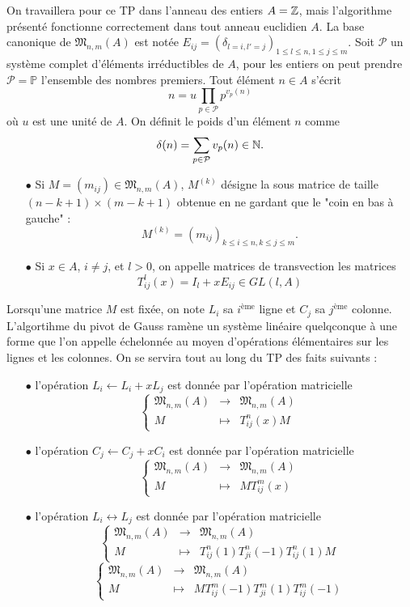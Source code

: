 On travaillera pour ce TP dans l'anneau des entiers $A=\mathbb Z$, mais l'algorithme présenté fonctionne correctement dans tout anneau euclidien $A$. La base canonique de $\mathfrak M_{n,m}(A)$ est notée $E_{ij}=(\delta_{l=i,l'=j})_{1\leq l\leq n,1\leq j\leq m}$. Soit $\mathcal P$ un système complet d'éléments irréductibles de $A$, pour les entiers on peut prendre $\mathcal P=\mathbb P$ l'ensemble des nombres premiers. Tout élément $n\in A$ s'écrit 
\[n=u\prod_{p\in\mathcal P} p^{v_p(n)}\]
où $u$ est une unité de $A$. On définit le poids d'un élément $n$ comme
\[\delta(n)=\sum_{p\in\mathcal P} v_p(n) \in \mathbb N.\]

\begin{itemize}
\item[$\bullet$] Si $M=(m_{ij})\in \mathfrak M_{n,m}(A)$, $M^{(k)}$ désigne la sous matrice de taille $(n-k+1)\times (m-k+1) $ obtenue en ne gardant que le "coin en bas à gauche" :
\[M^{(k)}=(m_{ij})_{k\leq i\leq n,k\leq j\leq m}.\]
\item[$\bullet$] Si $x\in A$, $i\neq j$, et $l>0$, on appelle matrices de transvection les matrices 
\[T_{ij}^l(x)=I_l + xE_{ij}\in GL(l,A)\]
\end{itemize}

Lorsqu'une matrice $M$ est fixée, on note $L_i$ sa $i^{\text{ème}}$ ligne et $C_j$ sa $j^{\text{ème}}$ colonne. L'algortihme du pivot de Gauss ramène un système linéaire quelqconque à une forme que l'on appelle échelonnée au moyen d'opérations élémentaires sur les lignes et les colonnes. On se servira tout au long du TP des faits suivants : \\

\begin{itemize}
\item[$\bullet$] l'opération $L_i\leftarrow L_i+xL_j$ est donnée par l'opération matricielle
\[\left\{\begin{array}{lll} \mathfrak M_{n,m}(A) & \rightarrow & \mathfrak M_{n,m}(A) \\ M & \mapsto& T_{ij}^n(x) M\end{array}\right.\]
\item[$\bullet$] l'opération $C_j\leftarrow C_j+xC_i$ est donnée par l'opération matricielle
\[\left\{\begin{array}{lll} \mathfrak M_{n,m}(A) & \rightarrow & \mathfrak M_{n,m}(A) \\ M & \mapsto & M T_{ij}^m(x)\end{array}\right.\]
\item[$\bullet$] l'opération $L_i\leftrightarrow L_j $ est donnée par l'opération matricielle
\[\left\{\begin{array}{lll} \mathfrak M_{n,m}(A) & \rightarrow & \mathfrak M_{n,m}(A) \\ M & \mapsto& T_{ij}^n(1)T_{ji}^n(-1)T_{ij}^n(1) M\end{array}\right.\]
\[\left\{\begin{array}{lll} \mathfrak M_{n,m}(A) & \rightarrow & \mathfrak M_{n,m}(A) \\ M & \mapsto& MT_{ij}^m(-1)T_{ji}^m(1)T_{ij}^m(-1) \end{array}\right.\]
\end{itemize}

